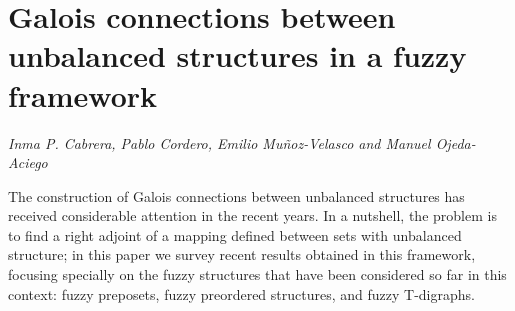 \documentclass[../booklet.tex]{subfiles}
\begin{document}
\section[Galois connections between unbalanced  structures in a fuzzy framework. {\it Inma P. Cabrera, Pablo Cordero, Emilio Muñoz-Velasco and Manuel Ojeda-Aciego}]{Galois connections between unbalanced  structures in a fuzzy framework}
   

\begin{center}
  {\it Inma P. Cabrera, Pablo Cordero, Emilio Muñoz-Velasco and Manuel Ojeda-Aciego}
\end{center}

\vskip 0.8cm


The construction of Galois connections between unbalanced structures has received considerable attention in the recent years. 
In a nutshell, the problem is to find a right adjoint of a mapping defined between sets with unbalanced structure; in this paper we survey recent results obtained in this framework, focusing specially on    the fuzzy structures that have been considered so far in this context:
   fuzzy preposets, fuzzy preordered structures,      and fuzzy T-digraphs.
 
\end{document}

